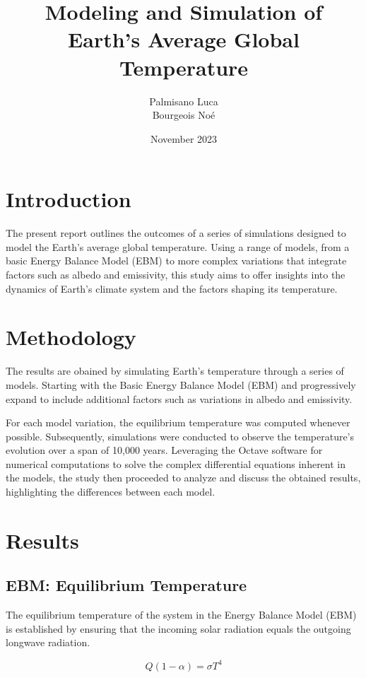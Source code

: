 \documentclass[12pt]{article}
\title{Modeling and Simulation of Earth's Average Global Temperature}
\author{Palmisano Luca \\ Bourgeois Noé}
\date{November 2023}
\begin{document}
\maketitle
\newpage

\section{Introduction}
The present report outlines the outcomes of a series of simulations designed to model the Earth's average global temperature. Using a range of models, from a basic Energy Balance Model (EBM) to more complex variations that integrate factors such as albedo and emissivity, this study aims to offer insights into the dynamics of Earth's climate system and the factors shaping its temperature.

\section{Methodology}
The results are obained by simulating Earth's temperature through a series of models. Starting with the Basic Energy Balance Model (EBM) and progressively expand to include additional factors such as variations in albedo and emissivity. 

For each model variation, the equilibrium temperature was computed whenever possible. Subsequently, simulations were conducted to observe the temperature's evolution over a span of 10,000 years. Leveraging the Octave software for numerical computations to solve the complex differential equations inherent in the models, the study then proceeded to analyze and discuss the obtained results, highlighting the differences between each model.

\section{Results}

\subsection{EBM: Equilibrium Temperature}
The equilibrium temperature of the system in the Energy Balance Model (EBM) is established by ensuring that the incoming solar radiation equals the outgoing longwave radiation\cite{kaper-2013-math-ac-equilibrium}.

\begin{equation} \label{eq:equilibrium-0}
    Q(1 - \alpha) = \sigma T^4
\end{equation}
\end{document}
